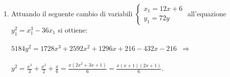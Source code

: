 \documentclass[a4paper]{article}
\newcommand{\sist}{\begin{cases}}
\newcommand{\esist}{\end{cases}}
\newcommand{\ds}{\displaystyle}
\begin{document}
\begin{enumerate}
\item Attuando il seguente cambio di variabili
$\sist x_1=12x+6\\
y_1=72y
\esist$
 all'equazione $y_1^2 = x_1^3 -36x_1$ si ottiene:\\ \\
$5184y^2=1728x^3+2592x^2+1296x+216-432x-216\;\;\Rightarrow\;\;$\\ \\
$y^2=\ds{\frac{x^3}{3}+\frac{x^2}{2}+\frac{x}{6}=\frac{x(2x^2+3x+1)}{6}=\frac{x(x+1)(2x+1)}{6}}$.\\


\end{enumerate}
\end{document}
